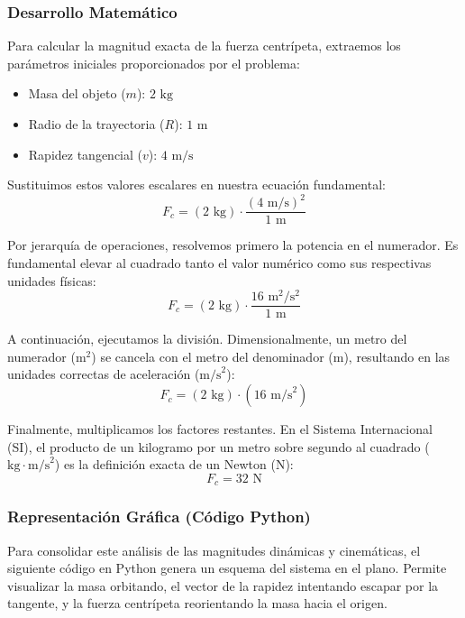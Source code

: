 \documentclass{article}
\begin{document}
\subsubsection*{Desarrollo Matemático}
Para calcular la magnitud exacta de la fuerza centrípeta, extraemos los parámetros iniciales proporcionados por el problema:
\begin{itemize}
    \item Masa del objeto ($m$): $2 \text{ kg}$
    \item Radio de la trayectoria ($R$): $1 \text{ m}$
    \item Rapidez tangencial ($v$): $4 \text{ m/s}$
\end{itemize}

Sustituimos estos valores escalares en nuestra ecuación fundamental:
$$F_c = (2 \text{ kg}) \cdot \frac{(4 \text{ m/s})^2}{1 \text{ m}}$$

Por jerarquía de operaciones, resolvemos primero la potencia en el numerador. Es fundamental elevar al cuadrado tanto el valor numérico como sus respectivas unidades físicas:
$$F_c = (2 \text{ kg}) \cdot \frac{16 \text{ m}^2/\text{s}^2}{1 \text{ m}}$$

A continuación, ejecutamos la división. Dimensionalmente, un metro del numerador ($\text{m}^2$) se cancela con el metro del denominador ($\text{m}$), resultando en las unidades correctas de aceleración ($\text{m/s}^2$):
$$F_c = (2 \text{ kg}) \cdot (16 \text{ m/s}^2)$$

Finalmente, multiplicamos los factores restantes. En el Sistema Internacional (SI), el producto de un kilogramo por un metro sobre segundo al cuadrado ($\text{kg} \cdot \text{m/s}^2$) es la definición exacta de un Newton ($\text{N}$):
$$F_c = 32 \text{ N}$$

\subsubsection*{Representación Gráfica (Código Python)}
Para consolidar este análisis de las magnitudes dinámicas y cinemáticas, el siguiente código en Python genera un esquema del sistema en el plano. Permite visualizar la masa orbitando, el vector de la rapidez intentando escapar por la tangente, y la fuerza centrípeta reorientando la masa hacia el origen.
\end{document}
